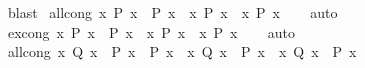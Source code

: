 \begin{isabellebody}
%
\isadelimproof
%
\endisadelimproof
%
\isatagproof
{}\isamarkupfalse%
\ blast%
\endisatagproof
{\isafoldproof}%
%
\isadelimproof
\isanewline
%
\endisadelimproof
\isanewline
{}\isamarkupfalse%
\ all{\isacharunderscore}{\kern0pt}cong{}{\isacharcolon}{\kern0pt}\ {\isachardoublequoteopen}{\isacharparenleft}{\kern0pt}{\isasymAnd}x{\isachardot}{\kern0pt}\ P\ x\ {\isacharequal}{\kern0pt}\ P{\isacharprime}{\kern0pt}\ x{\isacharparenright}{\kern0pt}\ {\isasymLongrightarrow}\ {\isacharparenleft}{\kern0pt}{\isasymforall}x{\isachardot}{\kern0pt}\ P\ x{\isacharparenright}{\kern0pt}\ {\isacharequal}{\kern0pt}\ {\isacharparenleft}{\kern0pt}{\isasymforall}x{\isachardot}{\kern0pt}\ P{\isacharprime}{\kern0pt}\ x{\isacharparenright}{\kern0pt}{\isachardoublequoteclose}\isanewline
%
\isadelimproof
\ \ %
\endisadelimproof
%
\isatagproof
{}\isamarkupfalse%
\ auto%
\endisatagproof
{\isafoldproof}%
%
\isadelimproof
\isanewline
%
\endisadelimproof
\isanewline
{}\isamarkupfalse%
\ ex{\isacharunderscore}{\kern0pt}cong{}{\isacharcolon}{\kern0pt}\ {\isachardoublequoteopen}{\isacharparenleft}{\kern0pt}{\isasymAnd}x{\isachardot}{\kern0pt}\ P\ x\ {\isacharequal}{\kern0pt}\ P{\isacharprime}{\kern0pt}\ x{\isacharparenright}{\kern0pt}\ {\isasymLongrightarrow}\ {\isacharparenleft}{\kern0pt}{\isasymexists}x{\isachardot}{\kern0pt}\ P\ x{\isacharparenright}{\kern0pt}\ {\isacharequal}{\kern0pt}\ {\isacharparenleft}{\kern0pt}{\isasymexists}x{\isachardot}{\kern0pt}\ P{\isacharprime}{\kern0pt}\ x{\isacharparenright}{\kern0pt}{\isachardoublequoteclose}\isanewline
%
\isadelimproof
\ \ %
\endisadelimproof
%
\isatagproof
{}\isamarkupfalse%
\ auto%
\endisatagproof
{\isafoldproof}%
%
\isadelimproof
\isanewline
%
\endisadelimproof
\isanewline
{}\isamarkupfalse%
\ all{\isacharunderscore}{\kern0pt}cong{\isacharcolon}{\kern0pt}\ {\isachardoublequoteopen}{\isacharparenleft}{\kern0pt}{\isasymAnd}x{\isachardot}{\kern0pt}\ Q\ x\ {\isasymLongrightarrow}\ P\ x\ {\isacharequal}{\kern0pt}\ P{\isacharprime}{\kern0pt}\ x{\isacharparenright}{\kern0pt}\ {\isasymLongrightarrow}\ {\isacharparenleft}{\kern0pt}{\isasymforall}x{\isachardot}{\kern0pt}\ Q\ x\ {\isasymlongrightarrow}\ P\ x{\isacharparenright}{\kern0pt}\ {\isacharequal}{\kern0pt}\ {\isacharparenleft}{\kern0pt}{\isasymforall}x{\isachardot}{\kern0pt}\ Q\ x\ {\isasymlongrightarrow}\ P{\isacharprime}{\kern0pt}\ x{\isacharparenright}{\kern0pt}{\isachardoublequoteclose}\isanewline
%
\isadelimproof
\ \ %
\endisadelimproof
%
\isatagproof
{}\isamarkupfalse%

\end{isabellebody}
